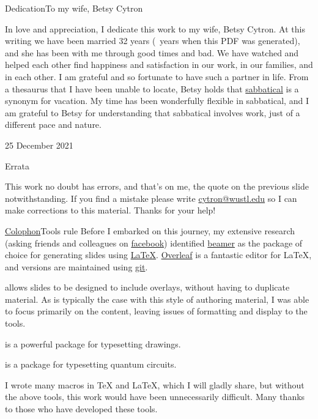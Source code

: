 \begin{frame}{Dedication}{To my wife, Betsy Cytron}

In love and appreciation, I dedicate this work to my wife, Betsy Cytron.  At this writing we have been married 32 years (\number\numexpr{}\relax~years when this PDF was generated), and she has been with me through good times and bad. We have watched and helped each other find happiness and satisfaction in our work, in our families, and in each other.  I am grateful and so fortunate to have such a partner in life.
\SmallSkip{}
From a thesaurus that I have been unable to locate,  Betsy holds that \href{https://www.merriam-webster.com/dictionary/sabbatical}{sabbatical} is a synonym for vacation.  My time has been wonderfully flexible in sabbatical, and I am grateful to Betsy for understanding that sabbatical involves work, just of a different pace and nature.
\begin{flushright}25 December 2021\end{flushright}
\end{frame}
\begin{frame}{Errata}

This work no doubt has errors, and that's on me, the quote on the previous slide notwithstanding.  If you find a mistake please write \href{mailto:cytron@wustl.edu}{cytron@wustl.edu} so I can make corrections to this material.
\BigSkip{}
Thanks for your help!
\end{frame}

\begin{frame}{\href{https://en.wikipedia.org/wiki/Colophon_(publishing)}{Colophon}}{Tools rule}
Before I embarked on this journey, my extensive research (asking friends and colleagues on \href{https://en.wikipedia.org/wiki/Facebook}{facebook}) identified \href{https://en.wikipedia.org/wiki/Beamer_(LaTeX)}{beamer} as the package of choice for generating slides using \href{https://en.wikibooks.org/wiki/LaTeX}{\LaTeX}.  \href{https://en.wikipedia.org/wiki/Overleaf}{Overleaf} is a fantastic editor for \LaTeX, and versions are maintained using \href{https://en.wikipedia.org/wiki/Git}{git}.

\begin{description}[<+->]
  \item[beamer] allows slides to be designed to include overlays, without having to duplicate material. As is typically the case with this style of authoring material, I was able to focus primarily on the content, leaving issues of formatting and display to the tools.
  \item[\href{https://en.wikibooks.org/wiki/LaTeX/PGF/TikZ}{tikz}] is a powerful package for typesetting drawings.
  \item[\href{https://ctan.org/pkg/quantikz?lang=en}{quantikz}] is a package for typesetting quantum circuits.
\end{description}
I wrote many macros in \TeX{} and \LaTeX{}, which I will gladly share, but without the above tools, this work would have been unnecessarily difficult.  Many thanks to those who have developed these tools.
\end{frame}

